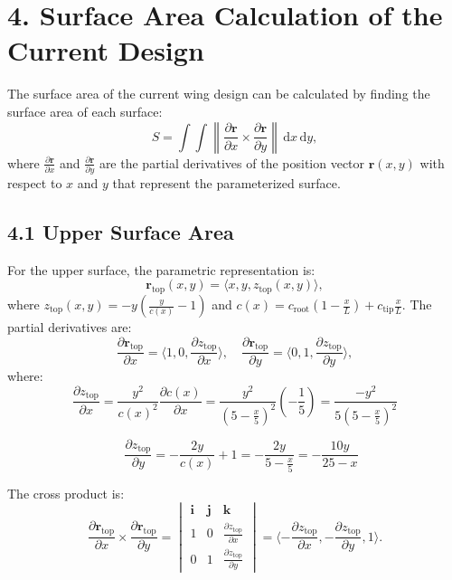 \documentclass[12pt]{article}
\begin{document}
\section*{4. Surface Area Calculation of the Current Design}
The surface area of the current wing design can be calculated by finding the surface area of each surface:
\[
S = \int \int \left\| \frac{\partial \mathbf{r}}{\partial x} \times \frac{\partial \mathbf{r}}{\partial y} \right\| \, \mathrm{d}x \, \mathrm{d}y,
\]
where \( \frac{\partial \mathbf{r}}{\partial x} \) and \( \frac{\partial \mathbf{r}}{\partial y} \) are the partial derivatives of the position vector \( \mathbf{r}(x, y) \) with respect to \(x\) and \(y\) that represent the parameterized surface.

\subsection*{4.1 Upper Surface Area}

For the upper surface, the parametric representation is:
\[
\mathbf{r}_{\text{top}}(x, y) = \langle x, y, z_{\text{top}}(x, y) \rangle,
\]
where \( z_{\text{top}}(x, y) = -y \left( \frac{y}{c(x)} - 1 \right) \) and \( c(x) = c_{\text{root}} \left( 1 - \frac{x}{L} \right) + c_{\text{tip}} \frac{x}{L} \). The partial derivatives are:
\[
\frac{\partial \mathbf{r}_{\text{top}}}{\partial x} = \langle 1, 0, \frac{\partial z_{\text{top}}}{\partial x} \rangle, \quad
\frac{\partial \mathbf{r}_{\text{top}}}{\partial y} = \langle 0, 1, \frac{\partial z_{\text{top}}}{\partial y} \rangle,
\]
where:
\[
\frac{\partial z_{\text{top}}}{\partial x} = \frac{y^2}{c(x)^2} \frac{\partial c(x)}{\partial x} = \frac{y^2}{(5 - \frac{x}{5})^2} \left(-\frac{1}{5}\right) = \frac{-y^2}{5(5 - \frac{x}{5})^2}\] 


\[
\quad \frac{\partial z_{\text{top}}}{\partial y} = -\frac{2y}{c(x)} + 1 = -\frac{2y}{5 - \frac{x}{5}} = -\frac{10y}{25 - x}
\]

The cross product is:
\[
\frac{\partial \mathbf{r}_{\text{top}}}{\partial x} \times \frac{\partial \mathbf{r}_{\text{top}}}{\partial y} =
\begin{vmatrix}
\mathbf{i} & \mathbf{j} & \mathbf{k} \\
1 & 0 & \frac{\partial z_{\text{top}}}{\partial x} \\
0 & 1 & \frac{\partial z_{\text{top}}}{\partial y}
\end{vmatrix} = \langle -\frac{\partial z_{\text{top}}}{\partial x}, -\frac{\partial z_{\text{top}}}{\partial y}, 1 \rangle.
\]
\end{document}
